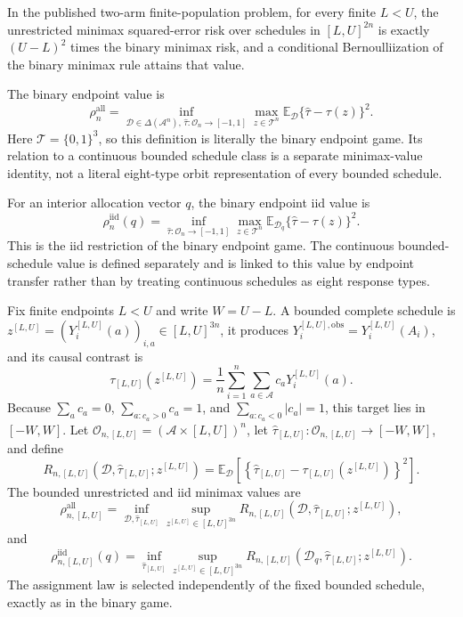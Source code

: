 In the published two-arm finite-population problem, for every finite \(L<U\), the unrestricted minimax squared-error risk over schedules in \([L,U]^{2n}\) is exactly \((U-L)^2\) times the binary minimax risk, and a conditional Bernoulliization of the binary minimax rule attains that value.

The binary endpoint value is
\[
\rho_n^{\mathrm{all}}=\inf_{\mathcal D\in\Delta(\mathcal A^n),\,\widehat\tau:\mathcal O_n\to[-1,1]}
\max_{z\in\mathcal T^n}\mathbb E_{\mathcal D}\{\widehat\tau-\tau(z)\}^2.
\]
Here \(\mathcal T=\{0,1\}^3\), so this definition is literally the binary endpoint game.  Its relation to a continuous bounded schedule class is a separate minimax-value identity, not a literal eight-type orbit representation of every bounded schedule.

For an interior allocation vector \(q\), the binary endpoint iid value is
\[
\rho_n^{\mathrm{iid}}(q)=\inf_{\widehat\tau:\mathcal O_n\to[-1,1]}
\max_{z\in\mathcal T^n}\mathbb E_{\mathcal D_q}\{\widehat\tau-\tau(z)\}^2.
\]
This is the iid restriction of the binary endpoint game.  The continuous bounded-schedule value is defined separately and is linked to this value by endpoint transfer rather than by treating continuous schedules as eight response types.

Fix finite endpoints \(L<U\) and write \(W=U-L\).  A bounded complete schedule is
\(z^{[L,U]}=(Y_i^{[L,U]}(a))_{i,a}\in[L,U]^{3n}\), it produces
\(Y_i^{[L,U],\mathrm{obs}}=Y_i^{[L,U]}(A_i)\), and its causal contrast is
\[
\tau_{[L,U]}(z^{[L,U]})
=\frac1n\sum_{i=1}^n\sum_{a\in\mathcal A}c_aY_i^{[L,U]}(a).
\]
Because \(\sum_ac_a=0\), \(\sum_{a:c_a>0}c_a=1\), and
\(\sum_{a:c_a<0}|c_a|=1\), this target lies in \([-W,W]\).  Let
\(\mathcal O_{n,[L,U]}=(\mathcal A\times[L,U])^n\), let
\(\widehat\tau_{[L,U]}:\mathcal O_{n,[L,U]}\to[-W,W]\), and define
\[
R_{n,[L,U]}(\mathcal D,\widehat\tau_{[L,U]};z^{[L,U]})
=\mathbb E_{\mathcal D}\left[
\left\{\widehat\tau_{[L,U]}-\tau_{[L,U]}(z^{[L,U]})\right\}^2\right].
\]
The bounded unrestricted and iid minimax values are
\[
\rho_{n,[L,U]}^{\mathrm{all}}
=\inf_{\mathcal D,\widehat\tau_{[L,U]}}
\sup_{z^{[L,U]}\in[L,U]^{3n}}
R_{n,[L,U]}(\mathcal D,\widehat\tau_{[L,U]};z^{[L,U]}),
\]
and
\[
\rho_{n,[L,U]}^{\mathrm{iid}}(q)
=\inf_{\widehat\tau_{[L,U]}}
\sup_{z^{[L,U]}\in[L,U]^{3n}}
R_{n,[L,U]}(\mathcal D_q,\widehat\tau_{[L,U]};z^{[L,U]}).
\]
The assignment law is selected independently of the fixed bounded schedule, exactly as in the binary game.

